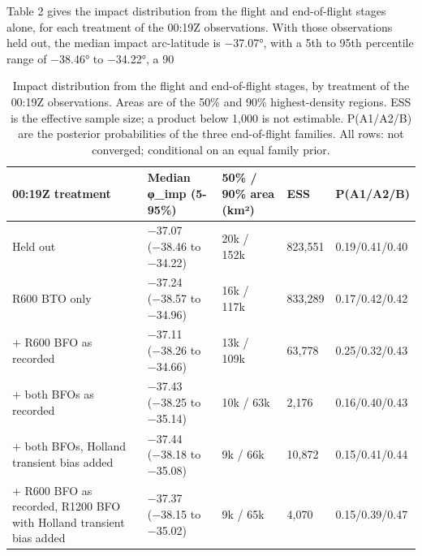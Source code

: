 \documentclass[12pt,a4paper]{article}
\begin{document}
Table 2 gives the impact distribution from the flight and end-of-flight stages alone, for each treatment of the 00:19Z observations. With those observations held out, the median impact arc-latitude is −37.07°, with a 5th to 95th percentile range of −38.46° to −34.22°, a 90%

\begin{table}[htbp]\centering\caption{Impact distribution from the flight and end-of-flight stages, by treatment of the 00:19Z observations. Areas are of the 50\% and 90\% highest-density regions. ESS is the effective sample size; a product below 1,000 is not estimable. P(A1/A2/B) are the posterior probabilities of the three end-of-flight families. All rows: not converged; conditional on an equal family prior.}

\vspace{3pt}\small\begin{tabular}{@{}p{3.9cm}p{3.5cm}p{2.5cm}p{1.9cm}p{2.2cm}@{}}\toprule

00:19Z treatment & Median φ\_imp (5-95\%) & 50\% / 90\% area (km²) & ESS & P(A1/A2/B) \\ \midrule

Held out & −37.07 (−38.46 to −34.22) & 20k / 152k & 823,551 & 0.19/0.41/0.40 \\

R600 BTO only & −37.24 (−38.57 to −34.96) & 16k / 117k & 833,289 & 0.17/0.42/0.42 \\

+ R600 BFO as recorded & −37.11 (−38.26 to −34.66) & 13k / 109k & 63,778 & 0.25/0.32/0.43 \\

+ both BFOs as recorded & −37.43 (−38.25 to −35.14) & 10k / 63k & 2,176 & 0.16/0.40/0.43 \\

+ both BFOs, Holland transient bias added & −37.44 (−38.18 to −35.08) & 9k / 66k & 10,872 & 0.15/0.41/0.44 \\

+ R600 BFO as recorded, R1200 BFO with Holland transient bias added & −37.37 (−38.15 to −35.02) & 9k / 65k & 4,070 & 0.15/0.39/0.47 \\

\bottomrule\end{tabular}\end{table}
\end{document}
